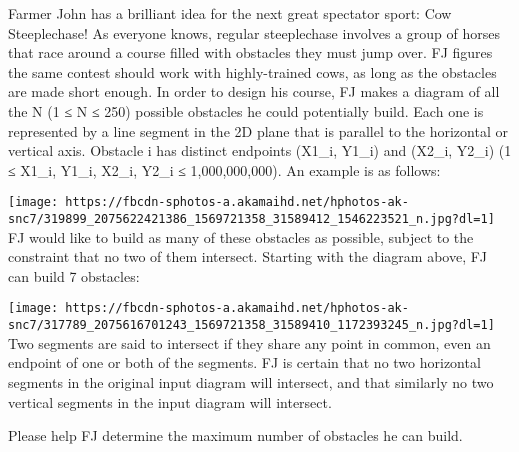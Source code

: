 Farmer John has a brilliant idea for the next great spectator sport: Cow Steeplechase! As everyone knows, regular steeplechase involves a group of horses that race around a course filled with obstacles they must jump over. FJ figures the same contest should work with highly-trained cows, as long as the obstacles are made short enough.  In order to design his course, FJ makes a diagram of all the N (1 ≤ N ≤ 250) possible obstacles he could potentially build. Each one is represented by a line segment in the 2D plane that is parallel to the horizontal or vertical axis. Obstacle i has distinct endpoints (X1\_i, Y1\_i) and (X2\_i, Y2\_i) (1 ≤ X1\_i, Y1\_i, X2\_i, Y2\_i ≤ 1,000,000,000). An example is as follows:   


\texttt{[image: https://fbcdn-sphotos-a.akamaihd.net/hphotos-ak-snc7/319899\_2075622421386\_1569721358\_31589412\_1546223521\_n.jpg?dl=1]}
\\

    FJ would like to build as many of these obstacles as possible, subject to the constraint that no two of them intersect. Starting with the diagram above, FJ can build 7 obstacles:   


\texttt{[image: https://fbcdn-sphotos-a.akamaihd.net/hphotos-ak-snc7/317789\_2075616701243\_1569721358\_31589410\_1172393245\_n.jpg?dl=1]}
\\

    Two segments are said to intersect if they share any point in common, even an endpoint of one or both of the segments.  FJ is certain that no two horizontal segments in the original input diagram will intersect, and that similarly no two vertical segments in the input diagram will intersect.   

    Please help FJ determine the maximum number of obstacles he can build.